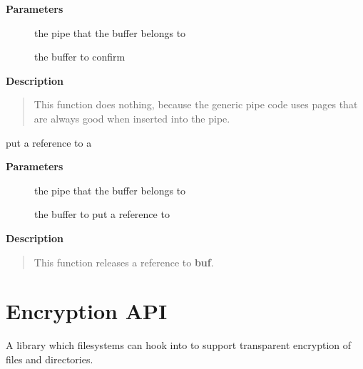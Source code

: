 \documentclass[a4paper,8pt,english]{sphinxmanual}
\begin{document}
\textbf{Parameters}
\begin{description}
\item[{}] \leavevmode
the pipe that the buffer belongs to

\item[{}] \leavevmode
the buffer to confirm

\end{description}

\textbf{Description}
\begin{quote}

This function does nothing, because the generic pipe code uses
pages that are always good when inserted into the pipe.
\end{quote}

\begin{fulllineitems}
\label{filesystems/index:c.generic_pipe_buf_release}
put a reference to a {\hyperref[filesystems/index:c.pipe_buffer]{\emph{}}}

\end{fulllineitems}


\textbf{Parameters}
\begin{description}
\item[{}] \leavevmode
the pipe that the buffer belongs to

\item[{}] \leavevmode
the buffer to put a reference to

\end{description}

\textbf{Description}
\begin{quote}

This function releases a reference to \textbf{buf}.
\end{quote}


\chapter{Encryption API}
\label{filesystems/index:encryption-api}
A library which filesystems can hook into to support transparent
encryption of files and directories.
\end{document}
